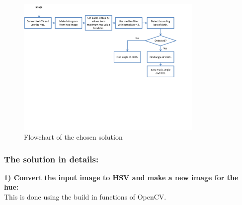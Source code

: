 

\begin{figure}[H]
\begin{center}
\leavevmode
\includegraphics[width=0.8\textwidth]{images/tabledetect_flowchart}
\end{center}
\caption{Flowchart of the chosen solution}
\label{fig:tabledetect_flowchart}
\end{figure}

\subsubsection{The solution in details:}
\textbf{1) Convert the input image to HSV and make a new image for the hue:}\\
This is done using the build in functions of OpenCV\cite{opencv}.\\

